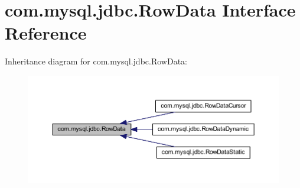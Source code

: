 \hypertarget{interfacecom_1_1mysql_1_1jdbc_1_1_row_data}{}\section{com.\+mysql.\+jdbc.\+Row\+Data Interface Reference}
\label{interfacecom_1_1mysql_1_1jdbc_1_1_row_data}


Inheritance diagram for com.\+mysql.\+jdbc.\+Row\+Data\+:
\nopagebreak
\begin{figure}[H]
\begin{center}
\leavevmode
\includegraphics[width=350pt]{interfacecom_1_1mysql_1_1jdbc_1_1_row_data__inherit__graph}
\end{center}
\end{figure}
